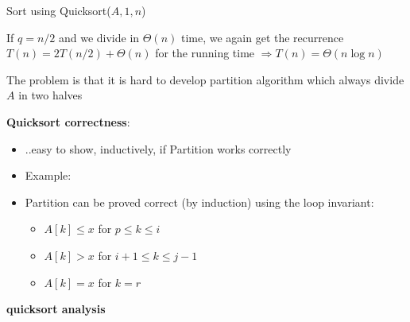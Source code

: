 \documentclass[11pt]{article}
\begin{document}
\begin{itemize}
Sort using {\sc Quicksort}($A,1,n$)

\vspace{\baselineskip}

  If $q=n/2$ and we divide in $\Theta(n)$ time, we again get the
   recurrence $T(n)=2T(n/2)+\Theta(n)$ for the running time
   $\Rightarrow T(n)=\Theta(n\log n)$

   The problem is that it is hard to develop partition algorithm which
   always divide $A$ in two halves


  
\end{itemize}

\vspace{\baselineskip}
       {\bf {\sc Quicksort} correctness}:
       \begin{itemize}
       \item ..easy to show, inductively, if {\sc Partition} works
	 correctly
       \item Example:
	 
	 
       \item{\sc Partition} can be proved correct (by induction) using the
	 loop invariant:
	 \begin{itemize}
	 \item $A[k]\leq x$ for $p\leq k\leq i$
	 \item $A[k]> x$ for $i+1\leq k\leq j-1$
	 \item $A[k]=x$ for $k=r$
	 \end{itemize}
       \end{itemize}
       
       
       \vspace{\baselineskip}
	      {\bf {\sc quicksort}  analysis}
	      
\end{document}
